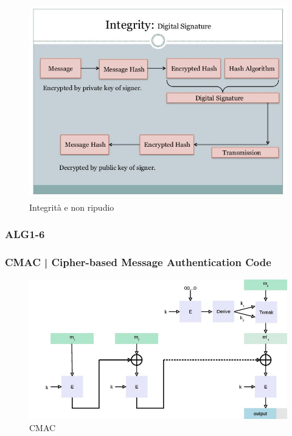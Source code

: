 \textsf{\small }

\begin{figure}[H]
	\centering
	\includegraphics[width=.9\textwidth, height=.9\textheight, keepaspectratio]{./images/aes_modes/encryption-integrity-and-nonrepudiation.png}
	\caption{Integrità e non ripudio}
	\label{fig:encryption-integrity-and-nonrepudiation}
\end{figure}

\subsubsection{ALG1-6}


\textsf{\small }

\subsubsection{CMAC | Cipher-based Message Authentication Code}


\textsf{\small }

\begin{figure}[H]
	\centering
	\includegraphics[width=.9\textwidth, height=.9\textheight, keepaspectratio]{./images/aes_modes/CMAC_-_Cipher-based_Message_Authentication_Code}
	\caption{CMAC}
	\label{fig:cmac}
\end{figure}

